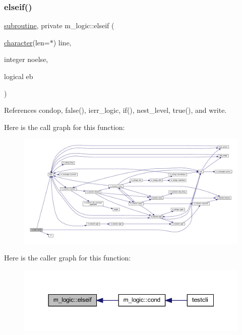 \subsubsection{\texorpdfstring{elseif()}{elseif()}}
{\footnotesize\ttfamily \hyperlink{M__stopwatch_83_8txt_acfbcff50169d691ff02d4a123ed70482}{subroutine}, private m\+\_\+logic\+::elseif (\begin{DoxyParamCaption}\item[{\hyperlink{option__stopwatch_83_8txt_abd4b21fbbd175834027b5224bfe97e66}{character}(len=$\ast$)}]{line,  }\item[{integer}]{noelse,  }\item[{logical}]{eb }\end{DoxyParamCaption})\hspace{0.3cm}{\ttfamily [private]}}



References condop, false(), ierr\+\_\+logic, if(), nest\+\_\+level, true(), and write.

Here is the call graph for this function\+:
\nopagebreak
\begin{figure}[H]
\begin{center}
\leavevmode
\includegraphics[width=350pt]{namespacem__logic_abb56458f58725800b593e986b23ec2d3_cgraph}
\end{center}
\end{figure}
Here is the caller graph for this function\+:
\nopagebreak
\begin{figure}[H]
\begin{center}
\leavevmode
\includegraphics[width=350pt]{namespacem__logic_abb56458f58725800b593e986b23ec2d3_icgraph}
\end{center}
\end{figure}
\mbox{\label{namespacem__logic_a60ae51929ab2f5d32f2a8f7e07e6debc}} 
